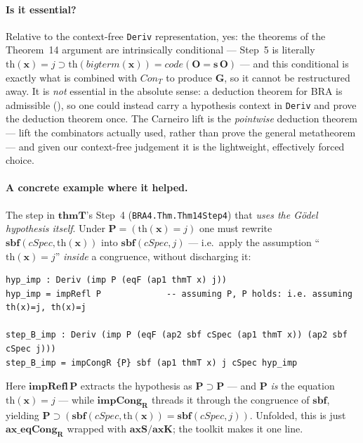 \documentclass[11pt]{article}
\theoremstyle{plain}
\theoremstyle{definition}
\theoremstyle{remark}
\newcommand{\code}[1]{\mathit{code}(#1)}
\newcommand{\sbf}{\mathbf{sbf}}
\newcommand{\thmT}{\mathbf{thmT}}
\newcommand{\Con}{\mathit{Con}}
\begin{document}
\paragraph{Is it essential?}  Relative to the context-free
\verb|Deriv| representation, yes: the theorems of the Theorem~14
argument are intrinsically conditional --- Step~5 is literally
$\mathrm{th}(\mathbf{x}) = j \supset \mathrm{th}(\mathit{bigterm}(\mathbf{x}))
= \code{\mathbf{O}=\mathbf{s}\,\mathbf{O}}$ --- and this conditional is
exactly what is combined with $\Con_T$ to produce $\mathbf{G}$, so it
cannot be restructured away.  It is \emph{not} essential in the absolute
sense: a deduction theorem for BRA is admissible (\cite[Exercise~19]{Guard1963}),
so one could instead carry a hypothesis context in \verb|Deriv| and prove
the deduction theorem once.  The Carneiro lift is the \emph{pointwise}
deduction theorem --- lift the combinators actually used, rather than
prove the general metatheorem --- and given our context-free judgement it
is the lightweight, effectively forced choice.

\paragraph{A concrete example where it helped.}  The step in
$\thmT$'s Step~4 (\verb|BRA4.Thm.Thm14Step4|) that \emph{uses the
G\"odel hypothesis itself}.  Under $\mathbf{P} = (\mathrm{th}(\mathbf{x})
= j)$ one must rewrite $\sbf(\mathit{cSpec}, \mathrm{th}(\mathbf{x}))$
into $\sbf(\mathit{cSpec}, j)$ --- i.e.\ apply the assumption
``$\mathrm{th}(\mathbf{x}) = j$'' \emph{inside} a congruence, without
discharging it:
\begin{lstlisting}
hyp_imp : Deriv (imp P (eqF (ap1 thmT x) j))
hyp_imp = impRefl P             -- assuming P, P holds: i.e. assuming th(x)=j, th(x)=j

step_B_imp : Deriv (imp P (eqF (ap2 sbf cSpec (ap1 thmT x)) (ap2 sbf cSpec j)))
step_B_imp = impCongR {P} sbf (ap1 thmT x) j cSpec hyp_imp
\end{lstlisting}
Here $\mathbf{impRefl}\,\mathbf{P}$ extracts the hypothesis as
$\mathbf{P} \supset \mathbf{P}$ --- and $\mathbf{P}$ \emph{is} the
equation $\mathrm{th}(\mathbf{x}) = j$ --- while $\mathbf{impCong_R}$
threads it through the congruence of $\sbf$, yielding
$\mathbf{P} \supset (\sbf(\mathit{cSpec}, \mathrm{th}(\mathbf{x})) =
\sbf(\mathit{cSpec}, j))$.  Unfolded, this is just $\mathbf{ax\_eqCong_R}$
wrapped with $\mathbf{axS}/\mathbf{axK}$; the toolkit makes it one line.
\end{document}
